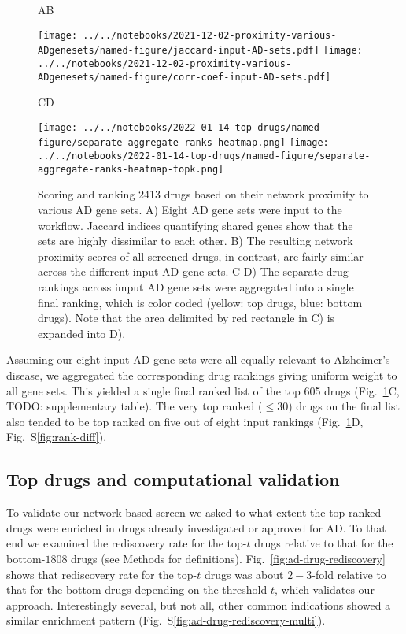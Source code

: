 \documentclass[letterpaper]{article}
\begin{document}
\begin{figure}
\hspace{0.05\textwidth}A\hspace{0.7\textwidth}B

\texttt{[image: ../../notebooks/2021-12-02-proximity-various-ADgenesets/named-figure/jaccard-input-AD-sets.pdf]}
\texttt{[image: ../../notebooks/2021-12-02-proximity-various-ADgenesets/named-figure/corr-coef-input-AD-sets.pdf]}

\hspace{0.05\textwidth}C\hspace{0.5\textwidth}D

\texttt{[image: ../../notebooks/2022-01-14-top-drugs/named-figure/separate-aggregate-ranks-heatmap.png]}
\texttt{[image: ../../notebooks/2022-01-14-top-drugs/named-figure/separate-aggregate-ranks-heatmap-topk.png]}

\caption{Scoring and ranking 2413 drugs based on their network proximity to
  various AD gene sets.  A) Eight AD gene sets were input to the workflow.
  Jaccard indices quantifying shared genes show that the sets are highly
  dissimilar to each other.  B) The resulting network proximity scores of all
  screened drugs, in contrast, are fairly similar across the different input
  AD gene sets.  C-D) The separate drug rankings across imput AD gene sets
  were aggregated into a single final ranking, which is color coded (yellow:
  top drugs, blue: bottom drugs).  Note that the area delimited by red
  rectangle in C) is expanded into D).
}
\label{fig:screen}
\end{figure}

Assuming our eight input AD gene sets were all equally relevant to Alzheimer's
disease, we aggregated the corresponding drug rankings giving uniform weight
to all gene sets.  This yielded a single final ranked list of the top 605
drugs (Fig.~\ref{fig:screen}C, TODO: supplementary table).  The very top
ranked ($\le 30$) drugs on the final list also tended to be top ranked on five
out of eight input rankings (Fig.~\ref{fig:screen}D,
Fig.~S\ref{fig:rank-diff}).

\subsection{Top drugs and computational validation}

To validate our network based screen we asked to what extent the top ranked
drugs were enriched in drugs already investigated or approved for AD.  To that
end we examined the rediscovery rate for the top-$t$ drugs relative to that
for the bottom-$1808$ drugs (see Methods for definitions).
Fig.~\ref{fig:ad-drug-rediscovery} shows that rediscovery rate for the top-$t$
drugs was about $2-3$-fold relative to that for the bottom drugs depending on
the threshold $t$, which validates our approach.  Interestingly several, but
not all, other common indications showed a similar enrichment pattern
(Fig.~S\ref{fig:ad-drug-rediscovery-multi}).
\end{document}

